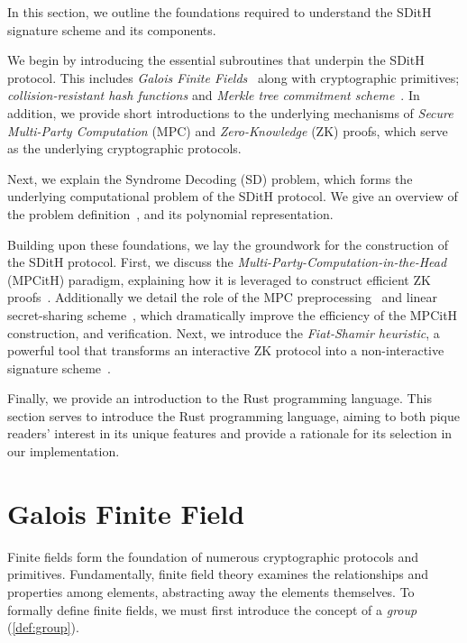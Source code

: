 \documentclass[11pt]{report}
\theoremstyle{definition}
\theoremstyle{plain}
\begin{document}
In this section, we outline the foundations required to understand the SDitH signature scheme and its components.

We begin by introducing the essential subroutines that underpin the SDitH protocol. This includes \textit{Galois Finite Fields}~\cite{martinez2023syndromes, reed1960polynomial, brownadvanced} along with cryptographic primitives; \textit{collision-resistant hash functions} and \textit{Merkle tree commitment scheme}~\cite{becker2008merkle}. In addition, we provide short introductions to the underlying mechanisms of \textit{Secure Multi-Party Computation} (MPC) and \textit{Zero-Knowledge} (ZK) proofs, which serve as the underlying cryptographic protocols.

Next, we explain the Syndrome Decoding (SD) problem, which forms the underlying computational problem of the SDitH protocol. We give an overview of the problem definition~\cite{aguilarsyndrome11, mceliece1978public, berlekamp1978inherent, baldi2013optimization}, and its polynomial representation.

Building upon these foundations, we lay the groundwork for the construction of the SDitH protocol. First, we discuss the \textit{Multi-Party-Computation-in-the-Head} (MPCitH) paradigm, explaining how it is leveraged to construct efficient ZK proofs~\cite{ishai2007zero}. Additionally we detail the role of the MPC preprocessing~\cite{baum2020concretely} and linear secret-sharing scheme~\cite{feneuil2023threshold}, which dramatically improve the efficiency of the MPCitH construction, and verification. Next, we introduce the \textit{Fiat-Shamir heuristic}, a powerful tool that transforms an interactive ZK protocol into a non-interactive signature scheme~\cite{fiat1986prove}.

Finally, we provide an introduction to the Rust programming language. This section serves to introduce the Rust programming language, aiming to both pique readers' interest in its unique features and provide a rationale for its selection in our implementation.

\section{Galois Finite Field}\label{sec:gf256}
Finite fields form the foundation of numerous cryptographic protocols and primitives. Fundamentally, finite field theory examines the relationships and properties among elements, abstracting away the elements themselves. To formally define finite fields, we must first introduce the concept of a \textit{group} (\autoref{def:group}).
\end{document}

